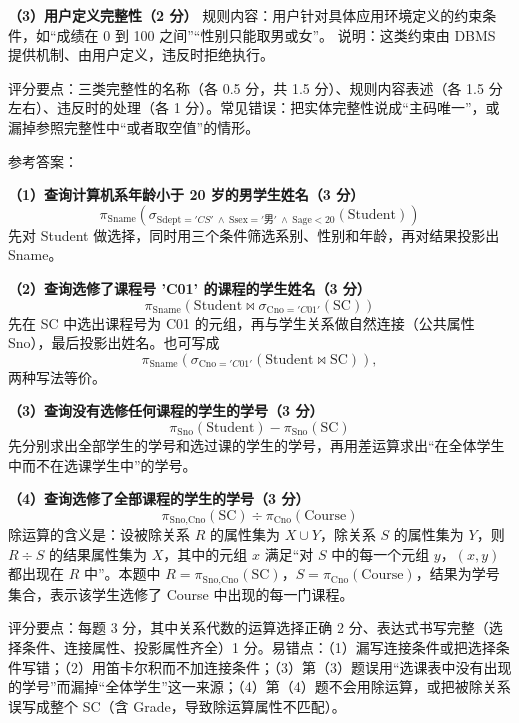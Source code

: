 \documentclass[a4paper,11pt]{article}
\begin{document}
\textbf{（3）用户定义完整性（2 分）}
规则内容：用户针对具体应用环境定义的约束条件，如“成绩在 0 到 100 之间”“性别只能取男或女”。
说明：这类约束由 DBMS 提供机制、由用户定义，违反时拒绝执行。
\begin{analysis}评分要点：三类完整性的名称（各 0.5 分，共 1.5 分）、规则内容表述（各 1.5 分左右）、违反时的处理（各 1 分）。常见错误：把实体完整性说成“主码唯一”，或漏掉参照完整性中“或者取空值”的情形。\end{analysis}


\q 参考答案：

\textbf{（1）查询计算机系年龄小于 20 岁的男学生姓名（3 分）}
\[
\pi_{\text{Sname}}\left(\sigma_{\text{Sdept}='CS'\ \wedge\ \text{Ssex}='男'\ \wedge\ \text{Sage}<20}(\text{Student})\right)
\]
先对 Student 做选择，同时用三个条件筛选系别、性别和年龄，再对结果投影出 Sname。

\textbf{（2）查询选修了课程号 'C01' 的课程的学生姓名（3 分）}
\[
\pi_{\text{Sname}}\left(\text{Student}\bowtie\sigma_{\text{Cno}='C01'}(\text{SC})\right)
\]
先在 SC 中选出课程号为 C01 的元组，再与学生关系做自然连接（公共属性 Sno），最后投影出姓名。也可写成
\[
\pi_{\text{Sname}}\left(\sigma_{\text{Cno}='C01'}(\text{Student}\bowtie\text{SC})\right),
\]
两种写法等价。

\textbf{（3）查询没有选修任何课程的学生的学号（3 分）}
\[
\pi_{\text{Sno}}(\text{Student})-\pi_{\text{Sno}}(\text{SC})
\]
先分别求出全部学生的学号和选过课的学生的学号，再用差运算求出“在全体学生中而不在选课学生中”的学号。

\textbf{（4）查询选修了全部课程的学生的学号（3 分）}
\[
\pi_{\text{Sno,Cno}}(\text{SC})\div\pi_{\text{Cno}}(\text{Course})
\]
除运算的含义是：设被除关系 $R$ 的属性集为 $X\cup Y$，除关系 $S$ 的属性集为 $Y$，则 $R\div S$ 的结果属性集为 $X$，其中的元组 $x$ 满足“对 $S$ 中的每一个元组 $y$，$(x,y)$ 都出现在 $R$ 中”。本题中 $R=\pi_{\text{Sno,Cno}}(\text{SC})$，$S=\pi_{\text{Cno}}(\text{Course})$，结果为学号集合，表示该学生选修了 Course 中出现的每一门课程。
\begin{analysis}评分要点：每题 3 分，其中关系代数的运算选择正确 2 分、表达式书写完整（选择条件、连接属性、投影属性齐全）1 分。易错点：（1）漏写连接条件或把选择条件写错；（2）用笛卡尔积而不加连接条件；（3）第（3）题误用“选课表中没有出现的学号”而漏掉“全体学生”这一来源；（4）第（4）题不会用除运算，或把被除关系误写成整个 SC（含 Grade，导致除运算属性不匹配）。\end{analysis}
\end{document}

